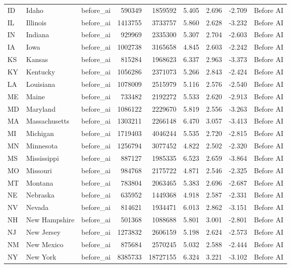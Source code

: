 \begin{tabular}{lllrrrrrl}
ID & Idaho & before\_ai & 590349 & 1859592 & 5.405 & 2.696 & -2.709 & Before AI \\
IL & Illinois & before\_ai & 1413755 & 3733757 & 5.860 & 2.628 & -3.232 & Before AI \\
IN & Indiana & before\_ai & 929969 & 2335300 & 5.307 & 2.704 & -2.603 & Before AI \\
IA & Iowa & before\_ai & 1002738 & 3165658 & 4.845 & 2.603 & -2.242 & Before AI \\
KS & Kansas & before\_ai & 815284 & 1968623 & 6.337 & 2.963 & -3.373 & Before AI \\
KY & Kentucky & before\_ai & 1056286 & 2371073 & 5.266 & 2.843 & -2.424 & Before AI \\
LA & Louisiana & before\_ai & 1078009 & 2515979 & 5.116 & 2.576 & -2.540 & Before AI \\
ME & Maine & before\_ai & 733482 & 2192272 & 5.533 & 2.620 & -2.913 & Before AI \\
MD & Maryland & before\_ai & 1086122 & 2229670 & 5.819 & 2.556 & -3.263 & Before AI \\
MA & Massachusetts & before\_ai & 1303211 & 2266148 & 6.470 & 3.057 & -3.413 & Before AI \\
MI & Michigan & before\_ai & 1719403 & 4046244 & 5.535 & 2.720 & -2.815 & Before AI \\
MN & Minnesota & before\_ai & 1256794 & 3077452 & 4.822 & 2.502 & -2.320 & Before AI \\
MS & Mississippi & before\_ai & 887127 & 1985335 & 6.523 & 2.659 & -3.864 & Before AI \\
MO & Missouri & before\_ai & 984768 & 2175722 & 4.871 & 2.546 & -2.325 & Before AI \\
MT & Montana & before\_ai & 783804 & 2063465 & 5.383 & 2.696 & -2.687 & Before AI \\
NE & Nebraska & before\_ai & 635952 & 1449368 & 4.918 & 2.587 & -2.331 & Before AI \\
NV & Nevada & before\_ai & 814621 & 1934471 & 6.013 & 2.862 & -3.151 & Before AI \\
NH & New Hampshire & before\_ai & 501368 & 1088688 & 5.801 & 3.001 & -2.801 & Before AI \\
NJ & New Jersey & before\_ai & 1273832 & 2606159 & 5.198 & 2.624 & -2.573 & Before AI \\
NM & New Mexico & before\_ai & 875684 & 2570245 & 5.032 & 2.588 & -2.444 & Before AI \\
NY & New York & before\_ai & 8385733 & 18727155 & 6.324 & 3.221 & -3.102 & Before AI \\

\end{tabular}
